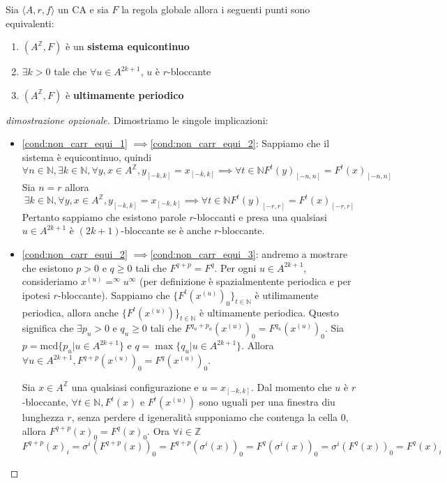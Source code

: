 \begin{teorema}
    Sia $\langle A,r,f\rangle$ un CA e sia $F$ la regola globale allora i seguenti
    punti sono equivalenti:
    \begin{enumerate}
        \item \label{cond:non_carr_equi_1} $(A^\mathbb{Z}, F)$ è un \textbf{sistema equicontinuo}
        \item \label{cond:non_carr_equi_2} $\exists k>0$ tale che $\forall u \in A^{2k+1}$, $u$ è $r$-bloccante
        \item \label{cond:non_carr_equi_3} $(A^\mathbb{Z}, F)$ è \textbf{ultimamente periodico}
    \end{enumerate}
    \begin{proof}[dimostrazione opzionale]
        Dimostriamo le singole implicazioni:
        \begin{itemize}
            \item \ref{cond:non_carr_equi_1} $\implies $\ref{cond:non_carr_equi_2}:
            Sappiamo che il sistema è equicontinuo, quindi
            $$\forall n\in \mathbb{N} ,\exists k\in \mathbb{N} , \forall y,x\in A^\mathbb{Z}, y_{[-k,k]} = x_{[-k,k]} \implies \forall t\in \mathbb{N} F^t(y)_{[-n,n]}=F^t(x)_{[-n,n]}$$
            Sia $n=r$ allora 
            $$\exists k\in \mathbb{N} , \forall y,x\in A^\mathbb{Z}, y_{[-k,k]} = x_{[-k,k]} \implies \forall t\in \mathbb{N} F^t(y)_{[-r,r]}=F^t(x)_{[-r,r]}$$
            Pertanto sappiamo che esistono parole $r$-bloccanti e presa una qualsiasi $u\in A^{2k+1}$ è $(2k+1)$-bloccante se è anche $r$-bloccante.
            \item \ref{cond:non_carr_equi_2} $\implies $\ref{cond:non_carr_equi_3}: 
            andremo a mostrare che esistono $p>0$ e $q\ge 0$ tali che $F^{q+p} = F^q$.
            Per ogni $u\in A^{2k+1}$, consideriamo $x^{(u)}=^\infty u^\infty$ (per 
            definizione è spazialmentente periodica e per ipotesi $r$-bloccante).
            Sappiamo che $\{F^t(x^{(u)})_0\}_{t\in \mathbb{N}}$ è utilimamente periodica,
            allora  anche $\{F^t(x^{(u)})\}_{t\in \mathbb{N}}$ è ultimamente periodica.
            Questo significa che $\exists p_u>0$ e $q_u\ge 0$ tali che $F^{q_u+p_u}(x^{(u)})_0 =F^{q_u}(x^{(u)})_0 $.
            Sia $p=\text{mcd}\{p_u|u\in A^{2k+1}\}$ e $q=\max\{q_u|u\in A^{2k+1}\}$.
            Allora $\forall u\in A^{2k+1}, F^{q+p}(x^{(u)})_0 = F^{q}(x^{(u)})_0$.

            Sia $x\in A^\mathbb{Z}$ una qualsiasi configurazione e $u=x_{[-k,k]}$.
            Dal momento che $u$ è $r$-bloccante, $\forall t\in \mathbb{N}, F^t(x)$
             e $ F^t(x^{(u)})$ sono uguali per una finestra diu lunghezza $r$, 
             senza perdere d igeneralità supponiamo che contenga la cella $0$, allora 
             $F^{q+p}(x)_0 = F^{q}(x)_0$. Ora $\forall i\in \mathbb{Z}$
             $$F^{q+p}(x)_i = \sigma^i(F^{q+p}(x))_0 = F^{q+p}(\sigma^i(x))_0= F^{q}(\sigma^i(x))_0 = \sigma^i(F^{q}(x))_0 = F^{q}(x)_i$$


\end{itemize}
\end{proof}
\end{teorema}
